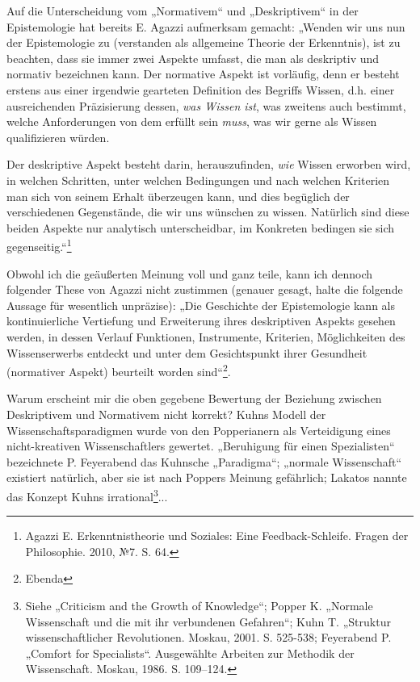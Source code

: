 \documentclass[11pt,a4paper]{article}
\begin{document}
Auf die Unterscheidung vom „Normativem“ und „Deskriptivem“ in der
Epistemologie hat bereits E. Agazzi aufmerksam gemacht: „Wenden wir uns nun
der Epistemologie zu (verstanden als allgemeine Theorie der Erkenntnis), ist
zu beachten, dass sie immer zwei Aspekte umfasst, die man als deskriptiv und
normativ bezeichnen kann. Der normative Aspekt ist vorläufig, denn er besteht
erstens aus einer irgendwie gearteten Definition des Begriffs Wissen,
d.h. einer ausreichenden Präzisierung dessen, \emph{was Wissen ist}, was
zweitens auch bestimmt, welche Anforderungen von dem erfüllt sein \emph{muss},
was wir gerne als Wissen qualifizieren würden.

Der deskriptive Aspekt besteht darin, herauszufinden, \emph{wie} Wissen
erworben wird, in welchen Schritten, unter welchen Bedingungen und nach
welchen Kriterien man sich von seinem Erhalt überzeugen kann, und dies
begüglich der verschiedenen Gegenstände, die wir uns wünschen zu wissen.
Natürlich sind diese beiden Aspekte nur analytisch unterscheidbar, im
Konkreten bedingen sie sich gegenseitig.“\footnote{Agazzi E. Erkenntnistheorie
  und Soziales: Eine Feedback-Schleife.  Fragen der Philosophie. 2010,
  №7. S. 64.}

Obwohl ich die geäußerten Meinung voll und ganz teile, kann ich dennoch
folgender These von Agazzi nicht zustimmen (genauer gesagt, halte die folgende
Aussage für wesentlich unpräzise): „Die Geschichte der Epistemologie kann als
kontinuierliche Vertiefung und Erweiterung ihres deskriptiven Aspekts gesehen
werden, in dessen Verlauf Funktionen, Instrumente, Kriterien, Möglichkeiten
des Wissenserwerbs entdeckt und unter dem Gesichtspunkt ihrer Gesundheit
(normativer Aspekt) beurteilt worden sind“\footnote{Ebenda}.

Warum erscheint mir die oben gegebene Bewertung der Beziehung zwischen
Deskriptivem und Normativem nicht korrekt? Kuhns Modell der
Wissenschaftsparadigmen wurde von den Popperianern als Verteidigung eines
nicht-kreativen Wissenschaftlers gewertet. „Beruhigung für einen Spezialisten“
bezeichnete P. Feyerabend das Kuhnsche „Paradigma“; „normale Wissenschaft“
existiert natürlich, aber sie ist nach Poppers Meinung gefährlich; Lakatos
nannte das Konzept Kuhns irrational\footnote{Siehe „Criticism and the Growth
  of Knowledge“; Popper K. „Normale Wissenschaft und die mit ihr verbundenen
  Gefahren“; Kuhn T. „Struktur wissenschaftlicher Revolutionen. Moskau, 2001.
  S. 525-538; Feyerabend P. „Comfort for Specialists“. Ausgewählte Arbeiten
  zur Methodik der Wissenschaft. Moskau, 1986. S. 109–124.}...
\end{document}
